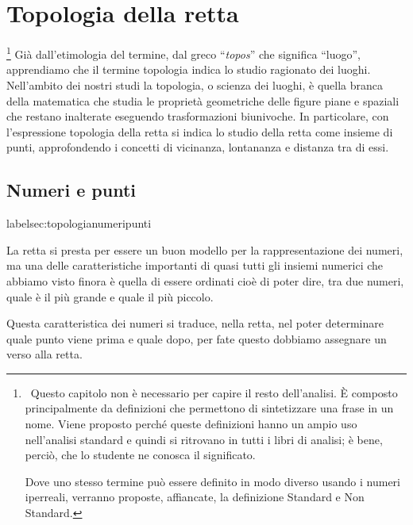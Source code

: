 


\chapter{Topologia della retta}

\footnote{~Questo capitolo non è necessario per capire il resto dell'analisi.
È composto principalmente da definizioni che permettono di sintetizzare una 
frase in un nome.
Viene proposto perché queste definizioni hanno un ampio uso nell'analisi 
standard e quindi si ritrovano in tutti i libri di analisi; 
è bene, perciò, che lo studente ne conosca il significato.

Dove uno stesso termine può essere definito in modo diverso 
usando i numeri iperreali, verranno proposte, affiancate, la definizione 
Standard e Non Standard.}
Già dall'etimologia del termine, dal greco ``\emph{topos}'' che significa 
``luogo'', apprendiamo che il termine topologia indica lo studio 
ragionato dei luoghi. 
Nell'ambito dei nostri studi la topologia, o scienza dei luoghi, 
è quella branca della matematica che studia le proprietà geometriche 
delle figure piane e spaziali che restano inalterate eseguendo 
trasformazioni biunivoche. 
In particolare, con l'espressione topologia della retta si indica 
lo studio della retta come insieme di punti, approfondendo i concetti di 
vicinanza, lontananza e distanza tra di essi.

\section{Numeri e punti}
label{sec:topologianumeripunti}

La retta si presta per essere un buon modello per la rappresentazione dei 
numeri, ma una delle caratteristiche importanti di quasi tutti gli insiemi 
numerici che abbiamo visto finora è quella di essere ordinati cioè di poter 
dire, tra due numeri, quale è il più grande e quale il più piccolo.

Questa caratteristica dei numeri si traduce, nella retta, nel poter 
determinare quale punto viene prima e quale dopo, 
per fate questo dobbiamo assegnare un verso alla retta.


